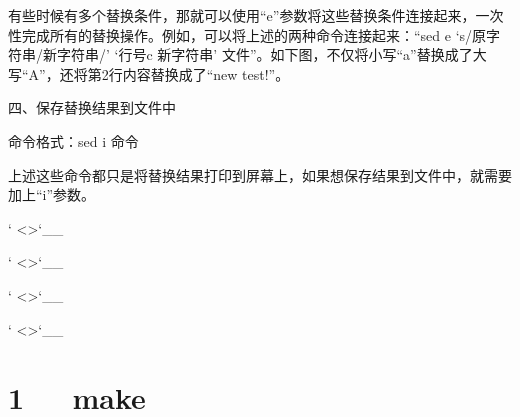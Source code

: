 \documentclass[letterpaper,12pt,english]{sphinxmanual}
\begin{document}
有些时候有多个替换条件，那就可以使用“\sphinxhyphen{}e”参数将这些替换条件连接起来，一次性完成所有的替换操作。例如，可以将上述的两种命令连接起来：“sed \sphinxhyphen{}e ‘s/原字符串/新字符串/’ ‘行号c 新字符串’ 文件”。如下图，不仅将小写“a”替换成了大写“A”，还将第2行内容替换成了“new test!”。

四、保存替换结果到文件中

\begin{sphinxVerbatim}[commandchars=\\\{\}]
命令格式：sed \PYGZhy{}i 命令
\end{sphinxVerbatim}

上述这些命令都只是将替换结果打印到屏幕上，如果想保存结果到文件中，就需要加上“\sphinxhyphen{}i”参数。

` <>`\_\_

` <>`\_\_

` <>`\_\_

` <>`\_\_


\chapter{1   make}
\label{\detokenize{001software/001install/make:make}}\label{\detokenize{001software/001install/make::doc}}
\end{document}
